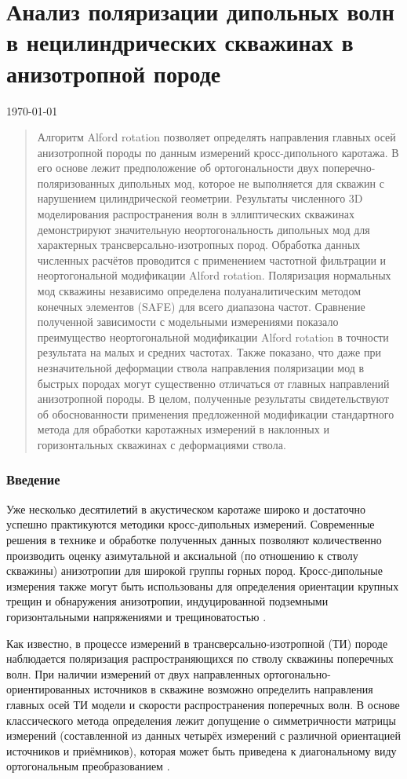 \documentclass[a4paper,11pt]{article}
\begin{document}
\part*{Анализ поляризации дипольных волн в нецилиндрических скважинах в анизотропной породе}
\today

\begin{abstract}
Алгоритм Alford rotation позволяет определять направления главных осей анизотропной породы по данным измерений кросс-дипольного каротажа. В его основе лежит предположение об ортогональности двух поперечно-поляризованных дипольных мод, которое не выполняется для скважин с нарушением цилиндрической геометрии. Результаты численного 3D моделирования распространения волн в эллиптических скважинах демонстрируют значительную неортогональность дипольных мод для характерных трансверсально-изотропных пород. Обработка данных численных расчётов проводится с применением частотной фильтрации и неортогональной модификации Alford rotation.
Поляризация нормальных мод скважины независимо определена полуаналитическим методом конечных элементов (SAFE) для всего диапазона частот. Сравнение полученной зависимости с модельными измерениями показало преимущество неортогональной модификации Alford rotation в точности результата на малых и средних частотах. Также показано, что даже при незначительной деформации ствола направления поляризации мод в быстрых породах могут существенно отличаться от главных направлений анизотропной породы. В целом, полученные результаты свидетельствуют об обоснованности применения предложенной модификации стандартного метода для обработки каротажных измерений в наклонных и горизонтальных скважинах с деформациями ствола.
\end{abstract}

\section{Введение}
Уже несколько десятилетий в акустическом каротаже широко и достаточно успешно практикуются методики кросс-дипольных измерений. Современные решения в технике и обработке полученных данных позволяют количественно производить оценку азимутальной и аксиальной (по отношению к стволу скважины) анизотропии для широкой группы горных пород. Кросс-дипольные измерения также могут быть использованы для определения ориентации крупных трещин и обнаружения анизотропии, индуцированной подземными горизонтальными напряжениями и трещиноватостью \cite{Patterson2001}.

Как известно, в процессе измерений в трансверсально-изотропной (ТИ) породе наблюдается поляризация распространяющихся по стволу скважины поперечных волн. При наличии измерений от двух направленных ортогонально-ориентированных источников в скважине возможно определить направления главных осей ТИ модели и скорости распространения поперечных волн. В основе классического метода определения лежит допущение о симметричности матрицы измерений (составленной из данных четырёх измерений с различной ориентацией источников и приёмников), которая может быть приведена к диагональному виду ортогональным преобразованием \cite{Alford1986}. 
\end{document}
